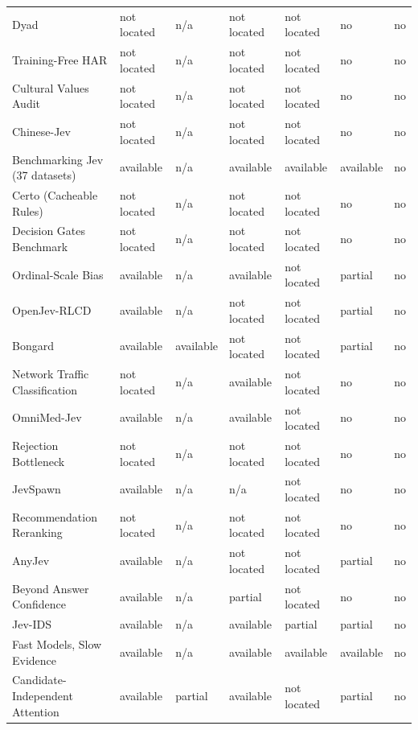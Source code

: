 \begin{table}[tbp]
\begin{tabularx}{\linewidth}{Xllllll}
Dyad & not located & n/\allowbreak{}a & not located & not located & no & no \\
Training-Free HAR & not located & n/\allowbreak{}a & not located & not located & no & no \\
Cultural Values Audit & not located & n/\allowbreak{}a & not located & not located & no & no \\
Chinese-Jev & not located & n/\allowbreak{}a & not located & not located & no & no \\
Benchmarking Jev (37 datasets) & available & n/\allowbreak{}a & available & available & available & no \\
Certo (Cacheable Rules) & not located & n/\allowbreak{}a & not located & not located & no & no \\
Decision Gates Benchmark & not located & n/\allowbreak{}a & not located & not located & no & no \\
Ordinal-Scale Bias & available & n/\allowbreak{}a & available & not located & partial & no \\
OpenJev-RLCD & available & n/\allowbreak{}a & not located & not located & partial & no \\
Bongard & available & available & not located & not located & partial & no \\
Network Traffic Classification & not located & n/\allowbreak{}a & available & not located & no & no \\
OmniMed-Jev & available & n/\allowbreak{}a & available & not located & no & no \\
Rejection Bottleneck & not located & n/\allowbreak{}a & not located & not located & no & no \\
JevSpawn & available & n/\allowbreak{}a & n/\allowbreak{}a & not located & no & no \\
Recommendation Reranking & not located & n/\allowbreak{}a & not located & not located & no & no \\
AnyJev & available & n/\allowbreak{}a & not located & not located & partial & no \\
Beyond Answer Confidence & available & n/\allowbreak{}a & partial & not located & no & no \\
Jev-IDS & available & n/\allowbreak{}a & available & partial & partial & no \\
Fast Models, Slow Evidence & available & n/\allowbreak{}a & available & available & available & no \\
Candidate-Independent Attention & available & partial & available & not located & partial & no \\

\end{tabularx}
\end{table}
